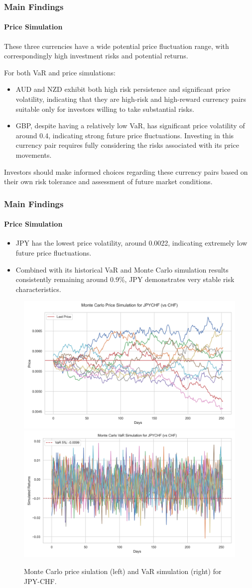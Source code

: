 \documentclass[10pt]{beamer}
\begin{document}
\begin{frame}
\frametitle{Main Findings}
\framesubtitle{Price Simulation}
These three currencies have a wide potential price fluctuation range, with correspondingly high investment risks and potential returns.

For both VaR and price simulations:
\begin{itemize}
    \item AUD and NZD exhibit both high risk persistence and significant price volatility, indicating that they are high-risk and high-reward currency pairs suitable only for investors willing to take substantial risks.
    \item GBP, despite having a relatively low VaR, has significant price volatility of around 0.4, indicating strong future price fluctuations. Investing in this currency pair requires fully considering the risks associated with its price movements.
\end{itemize}
Investors should make informed choices regarding these currency pairs based on their own risk tolerance and assessment of future market conditions.
\end{frame}
\begin{frame}
\frametitle{Main Findings}
\framesubtitle{Price Simulation}
\begin{itemize}
    \item JPY has the lowest price volatility, around 0.0022, indicating extremely low future price fluctuations. 
    \item Combined with its historical VaR and Monte Carlo simulation results consistently remaining around 0.9\%, JPY demonstrates very stable risk characteristics. 
\end{itemize}
\begin{figure}
    \centering  \includegraphics[width=0.48\linewidth]{reports/figures/monte_carlo_price_simulation_JPYCHF_vs_CHF.png}  \label{fig:monte_carlo_price_simulation_JPYCHF_vs_CHF}
    \includegraphics[width=0.48\linewidth]{reports/figures/monte_carlo_var_simulation_JPYCHF_vs_CHF.png}  \label{fig:monte_carlo_var_simulation_JPYCHF_vs_CHF}
    \caption{\footnotesize Monte Carlo price siulation (left) and VaR simulation (right) for JPY-CHF.}
\end{figure}
\end{frame}
\end{document}
